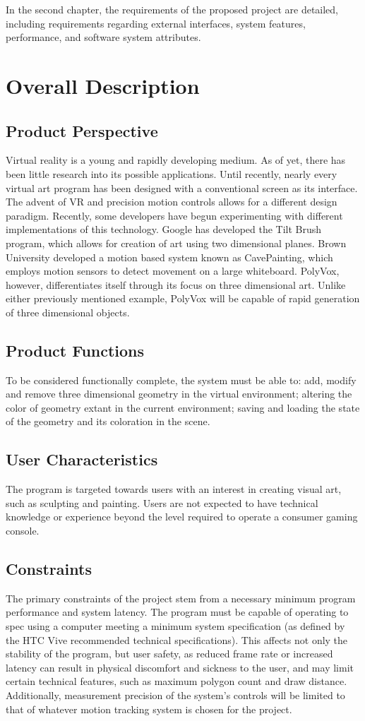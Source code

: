 \documentclass[onecolumn, draftclsnofoot,10pt, compsoc]{IEEEtran}
\begin{document}
In the second chapter, the requirements of the proposed project are detailed, including requirements regarding external interfaces, system features, performance, and software system attributes.
\section{Overall Description}
\subsection{Product Perspective}
Virtual reality is a young and rapidly developing medium. As of yet, there has been little research into its possible applications. Until recently, nearly every virtual art program has been designed with a conventional screen as its interface. The advent of VR and precision motion controls allows for a different design paradigm. Recently, some developers have begun experimenting with different implementations of this technology. Google has developed the Tilt Brush program, which allows for creation of art using two dimensional planes. Brown University developed a motion based system known as CavePainting, which employs motion sensors to detect movement on a large whiteboard. PolyVox, however, differentiates itself through its focus on three dimensional art. Unlike either previously mentioned example, PolyVox will be capable of rapid generation of three dimensional objects.\cite{cave}\cite{tilt}
\subsection{Product Functions}
 To be considered functionally complete, the system must be able to: add, modify and remove three dimensional geometry in the virtual environment; altering the color of geometry extant in the current environment; saving and loading the state of the geometry and its coloration in the scene.
\subsection{User Characteristics}
The program is targeted towards users with an interest in creating visual art, such as sculpting and painting. Users are not expected to have technical knowledge or experience beyond the level required to operate a consumer gaming console.
\subsection{Constraints}
The primary constraints of the project stem from a necessary minimum program performance and system latency. The program must be capable of operating to spec using a computer meeting a minimum system specification (as defined by the HTC Vive recommended technical specifications). This affects not only the stability of the program, but user safety, as reduced frame rate or increased latency can result in physical discomfort and sickness to the user, and may limit certain technical features, such as maximum polygon count and draw distance. Additionally, measurement precision of the system’s controls will be limited to that of whatever motion tracking system is chosen for the project.
\end{document}
